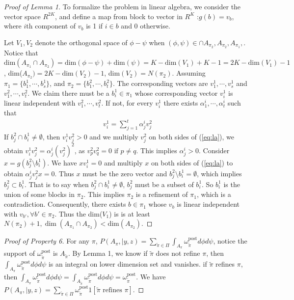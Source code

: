 \documentclass[aoas,preprint]{imsart}
\begin{document}
\begin{proof}[Proof of Lemma 1]
To formalize the problem in linear algebra, 
we consider the vector space $R^{2K}$, and define a map from block to vector in $R^K$ :$g(b) = v_b$, where $i$th component of $v_b$ is 1 if $i \in b$ and 0 otherwise.

Let $V_1, V_2$ denote the orthogonal space of $\phi - \psi$ when $(\phi,\psi)\in  \cap A_{\pi_2}, A_{\pi_2}, A_{\pi_1},$. Notice that $\text{dim}(A_{\pi_1} \cap A_{\pi_2}) = \text{dim}(\phi - \psi) + \text{dim}(\psi) = K - \text{dim}(V_1)  + K- 1=  2K -  \text{dim}(V_1)  -1$, dim($A_{\pi_2}) = 2K - \text{dim}(V_2) - 1$, dim$(V_2) = N(\pi_2)$.
Assuming $\pi_1 = \{b_1^1,\cdots,b_s^1\}$, and  $\pi_2 = \{b_1^2,\cdots,b_t^2\}$. 
The corresponding vectors are $v_1^1,\cdots,v_s^1$ and $v_1^2,\cdots,v_t^2$. 
We claim there must be a $b_i^1\in \pi_1$ whose corresponding vector $v_i^1$ is linear independent 
with $v_1^2,\cdots,v_t^2$. If not, for every $v_i^1$ there exists $\alpha_1^i,\cdots,\alpha_t^i$ 
such that 
\begin{eqnarray}
\label{eq:la}
v_i^1 = \sum_{j = 1}^t \alpha_j^i v_j^2 
\end{eqnarray}
If $b_j^2 \cap b_i^1 \neq \emptyset$, then $v_i^1  v_j^2 > 0$ and we multiply $v_j^2$ on both sides of 
(\ref{eq:la}), we obtain $v_i^1  v_j^2 = \alpha_j^i (v_j^2)^2$, as $v_p^2  v_q^2 = 0 \text{ if } p\neq q$. This implies $\alpha_j^i > 0$. Consider $x = g(b_j^2\setminus b_i^1)$. We have $xv_i^1 = 0$ and multiply $x$ on both sides of (\ref{eq:la}) to obtain $\alpha_j^i v_j^2x = 0$. Thus $x$ must be the zero vector and $b_j^2\setminus b_i^1= \emptyset$, which implies $b_j^2 \subset b_i^1$. That is to say when $b_j^2 \cap b_i^1 \neq \emptyset$, $b_j^2$ must 
be  a subset of $b_i^1$. So $b_i^1$ is the union of some blocks in $\pi_2$.  
 This implies $\pi_2$ is a refinement of $\pi_1$, which is  a contradiction.
Consequently, there exists $b\in\pi_1$ whose $v_b$ is linear independent with $v_{b'}, \forall b'\in\pi_2$. Thus the dim($V_1$) is is at least $N(\pi_2) + 1, \dim(A_{\pi_1} \cap A_{\pi_2}) < \text{dim}(A_{\pi_2})$.
\end{proof}

\begin{proof}[Proof of Property 6]
For any $\pi$, $P(A_\pi, | y, z) = \underset{\tilde \pi \in \Pi}{\sum} \int_{A_{\pi}} \omega_{\tilde \pi}^{\text{post}} d\phi d\psi$, 
notice the support of $\omega_{\tilde \pi}^{\text{post}}$ is $A_{\tilde \pi}$. 
By Lemma 1, we know if $\tilde \pi$ does not refine $\pi$, then $\int_{A_{\pi}} \omega_{\tilde \pi}^{\text{post}} d\phi d\psi$ is an integral on lower dimension set and vanishes. if $\tilde \pi$ refines $\pi$, then 
$\int_{A_{\pi}} \omega_{\tilde \pi}^{\text{post}} d\phi d\psi = \int_{A_{\tilde \pi}} \omega_{\tilde \pi}^{\text{post}} d\phi d\psi = \omega_{\tilde \pi}^{\text{post}}$. We have $P(A_\pi, | y, z) = \underset{\tilde \pi \in \Pi}{\sum} \omega_{\tilde \pi}^{\text{post}} 1[\tilde \pi \text{ refines } \pi ]$.
\end{proof}
\end{document}
